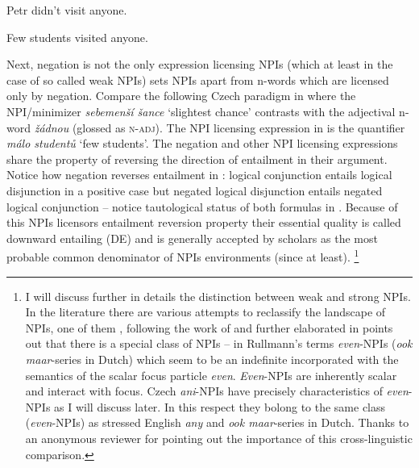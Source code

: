 \documentclass[output=paper,
]{langscibook}
\begin{document}
\label{ex-8}
\z

\ea \label{ex-9} Petr didn't visit anyone.
\z
\z

\ea Few students visited anyone.\label{ex-9-5}
\z

\noindent Next, negation is not the only expression licensing NPIs (which at least in the case of so called weak NPIs) sets NPIs apart from n-words which are licensed only by negation. Compare the following Czech paradigm in  where the NPI/minimizer \textit{sebemenší šance} `slightest chance' contrasts with the adjectival n-word \textit{žádnou} (glossed as \textsc{n-adj}). The NPI licensing expression in  is the quantifier \textit{málo studentů} `few students'. The negation and other  NPI licensing expressions share the property of reversing the direction of entailment in their argument. Notice how negation reverses entailment in : logical conjunction entails logical disjunction in a positive case but negated logical disjunction entails negated logical conjunction -- notice tautological status of both formulas in . Because of this NPIs licensors entailment reversion property their essential quality is called downward entailing (DE) and is generally accepted by scholars as the most probable common denominator of NPIs environments (since \citealt{ladusaw1992expressing} at least).%
\footnote{I will discuss further in details the distinction between weak and strong NPIs. In the literature there are various attempts to reclassify the landscape of NPIs, one of them \citealt{rullmann1996two}, following the work of \citealt{krifka1995semantics} and further elaborated in \citealt{lahiri1998focus} points out that there is a special class of NPIs -- in Rullmann's terms \textit{even}-NPIs (\textit{ook maar}-series in Dutch) which seem to be an indefinite incorporated with the semantics of the scalar focus particle \textit{even}. \textit{Even}-NPIs are inherently scalar and interact with focus. Czech \textit{ani}-NPIs have precisely characteristics of \textit{even}-NPIs as I will discuss later. In this respect they bolong to the same class (\textit{even}-NPIs) as stressed English \textit{any} and \textit{ook maar}-series in Dutch. Thanks to an anonymous reviewer for pointing out the importance of this cross-linguistic comparison.}
\end{document}
